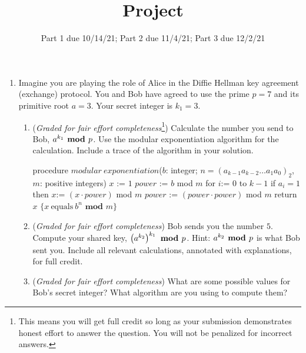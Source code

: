 \documentclass[12pt, oneside]{article}
\begin{document}
\begin{enumerate}
\begin{enumerate}
    \end{enumerate}

    \item Imagine you are playing the role of Alice in the Diffie Hellman key agreement (exchange) protocol.  
    You and Bob have agreed to use the prime $p = 7$ and its primitive root $a = 3$.
    Your secret integer is $k_1 = 3$.
        
        \begin{enumerate}
        \item  ({\it Graded for fair effort completeness}\footnote{This means 
        you will get full credit so long as your submission demonstrates honest 
        effort to answer the question. You will not be penalized for incorrect answers.}) 
        Calculate the number you send to Bob, 
        $a^{k_1} \textrm{\bf ~mod~} p$.  Use the modular exponentiation algorithm
        for the calculation. Include a trace of the algorithm in your solution.

        

\begin{algorithm}[caption={Modular Exponentation}]
    procedure $modular~exponentiation$($b$: integer; 
                 $n = (a_{k-1}a_{k-2} \ldots a_1 a_0)_2$, $m$: positive integers)
    $x$ := $1$
    $power$ := $b$ mod $m$
    for $i$:= $0$ to $k-1$
      if $a_i = 1$ then $x$:= $(x \cdot power)$ mod $m$
      $power$ := $(power \cdot power)$ mod $m$
    return $x$ $\{x~\textrm{equals}~b^n \textbf{ mod } m\} $
\end{algorithm}         
        \item  ({\it Graded for fair effort completeness}) Bob sends you the number $5$. Compute  your shared key, $\left(a^{k_2}\right)^{k_1}  
        \textrm{\bf ~mod~} p$.
        Hint: $a^{k_2} \textrm{\bf ~mod~} p$ is what Bob sent you.  Include all relevant calculations, annotated with explanations, 
        for full credit.
        
        
        \item ({\it Graded for fair effort completeness}) What are some possible values for Bob's secret integer?  What 
        algorithm are you using to compute them?
        \end{enumerate}
    

\end{enumerate}


    
\newpage

\title{Project}
\date{Part 1 due 10/14/21; Part 2 due 11/4/21; Part 3 due 12/2/21}
\end{document}
